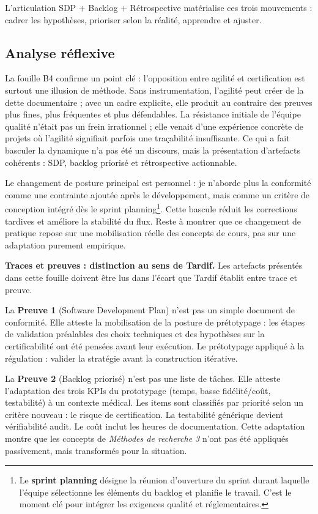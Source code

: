 L'articulation SDP + Backlog + Rétrospective matérialise ces trois mouvements : cadrer les hypothèses, prioriser selon la réalité, apprendre et ajuster.

\subsection{Analyse réflexive}

La fouille B4 confirme un point clé : l'opposition entre agilité et certification est surtout une illusion de méthode. Sans instrumentation, l'agilité peut créer de la dette documentaire ; avec un cadre explicite, elle produit au contraire des preuves plus fines, plus fréquentes et plus défendables. La résistance initiale de l'équipe qualité n'était pas un frein irrationnel ; elle venait d'une expérience concrète de projets où l'agilité signifiait parfois une traçabilité insuffisante. Ce qui a fait basculer la dynamique n'a pas été un discours, mais la présentation d'artefacts cohérents : SDP, backlog priorisé et rétrospective actionnable.

Le changement de posture principal est personnel : je n'aborde plus la conformité comme une contrainte ajoutée après le développement, mais comme un critère de conception intégré dès le sprint planning\footnote{Le \textbf{sprint planning} désigne la réunion d'ouverture du sprint durant laquelle l'équipe sélectionne les éléments du backlog et planifie le travail. C'est le moment clé pour intégrer les exigences qualité et réglementaires.}. Cette bascule réduit les corrections tardives et améliore la stabilité du flux. Reste à montrer que ce changement de pratique repose sur une mobilisation réelle des concepts de cours, pas sur une adaptation purement empirique.

\medskip

\textbf{Traces et preuves : distinction au sens de Tardif.}
Les artefacts présentés dans cette fouille doivent être lus dans l'écart que Tardif établit entre trace et preuve.

La \textbf{Preuve 1} (Software Development Plan) n'est pas un simple document de conformité. Elle atteste la mobilisation de la posture de prétotypage : les étapes de validation préalables des choix techniques et des hypothèses sur la certificabilité ont été pensées avant leur exécution. Le prétotypage appliqué à la régulation : valider la stratégie avant la construction itérative.

La \textbf{Preuve 2} (Backlog priorisé) n'est pas une liste de tâches. Elle atteste l'adaptation des trois KPIs du prototypage (temps, basse fidélité/coût, testabilité) à un contexte médical. Les items sont classifiés par priorité selon un critère nouveau : le risque de certification. La testabilité générique devient vérifiabilité audit. Le coût inclut les heures de documentation. Cette adaptation montre que les concepts de \textit{Méthodes de recherche 3} n'ont pas été appliqués passivement, mais transformés pour la situation.

